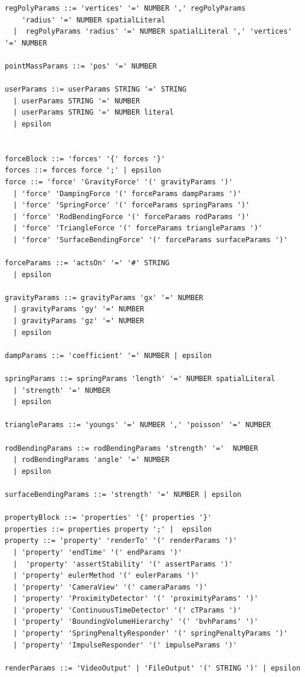 \begin{verbatim}
regPolyParams ::= 'vertices' '=' NUMBER ',' regPolyParams 
    'radius' '=' NUMBER spatialLiteral
  |  regPolyParams 'radius' '=' NUMBER spatialLiteral ',' 'vertices' '=' NUMBER

pointMassParams ::= 'pos' '=' NUMBER

userParams ::= userParams STRING '=' STRING 
  | userParams STRING '=' NUMBER 
  | userParams STRING '=' NUMBER literal
  | epsilon


forceBlock ::= 'forces' '{' forces '}'
forces ::= forces force ';' | epsilon
force ::= 'force' 'GravityForce' '(' gravityParams ')' 
  | 'force' 'DampingForce '(' forceParams dampParams ')' 
  | 'force' 'SpringForce' '(' forceParams springParams ')' 
  | 'force' 'RodBendingForce '(' forceParams rodParams ')' 
  | 'force' 'TriangleForce '(' forceParams triangleParams ')' 
  | 'force' 'SurfaceBendingForce' '(' forceParams surfaceParams ')' 

forceParams ::= 'actsOn' '=' '#' STRING
  | epsilon

gravityParams ::= gravityParams 'gx' '=' NUMBER
  | gravityParams 'gy' '=' NUMBER
  | gravityParams 'gz' '=' NUMBER
  | epsilon

dampParams ::= 'coefficient' '=' NUMBER | epsilon

springParams ::= springParams 'length' '=' NUMBER spatialLiteral
  | 'strength' '=' NUMBER
  | epsilon

triangleParams ::= 'youngs' '=' NUMBER ',' 'poisson' '=' NUMBER

rodBendingParams ::= rodBendingParams 'strength' '='  NUMBER
  | rodBendingParams 'angle' '=' NUMBER
  | epsilon

surfaceBendingParams ::= 'strength' '=' NUMBER | epsilon

propertyBlock ::= 'properties' '{' properties '}'
properties ::= properties property ';' |  epsilon
property ::= 'property' 'renderTo' '(' renderParams ')' 
  | 'property' 'endTime' '(' endParams ')' 
  |  'property' 'assertStability' '(' assertParams ')' 
  | 'property' eulerMethod '(' eulerParams ')' 
  | 'property' 'CameraView' '(' cameraParams ')' 
  | 'property' 'ProximityDetector' '(' 'proximityParams' ')' 
  | 'property' 'ContinuousTimeDetector' '(' cTParams ')'
  | 'property' 'BoundingVolumeHierarchy' '(' 'bvhParams' ')'
  | 'property' 'SpringPenaltyResponder' '(' springPenaltyParams ')'
  | 'property' 'ImpulseResponder' '(' impulseParams ')'

renderParams ::= 'VideoOutput' | 'FileOutput' '(' STRING ')' | epsilon


\end{verbatim}
